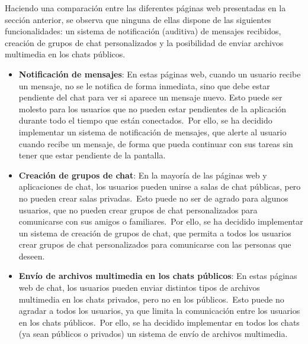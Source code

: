 
Haciendo una comparación entre las diferentes páginas web presentadas en la sección anterior, se
observa que ninguna de ellas dispone de las siguientes funcionalidades: un sistema de notificación (auditiva)
de mensajes recibidos, creación de grupos de chat personalizados y la posibilidad de enviar archivos
multimedia en los chats públicos.

\begin{itemize}
	\item \textbf{Notificación de mensajes}: En estas páginas web, cuando un usuario recibe un mensaje, no se le
	notifica de forma inmediata, sino que debe estar pendiente del chat para ver si aparece un mensaje nuevo.
	Esto puede ser molesto para los usuarios que no pueden estar pendientes de la aplicación durante todo el
	tiempo que están conectados.\ Por ello, se ha decidido implementar un sistema de notificación de mensajes,
	que alerte al usuario cuando recibe un mensaje, de forma que pueda continuar con sus tareas sin tener que
	estar pendiente de la pantalla.

	\item \textbf{Creación de grupos de chat}: En la mayoría de las páginas web y aplicaciones de chat, los usuarios
	pueden unirse a salas de chat públicas, pero no pueden crear salas privadas.\ Esto puede no ser de agrado
	para algunos usuarios, que no pueden crear grupos de chat personalizados para comunicarse con sus amigos o
	familiares.\ Por ello, se ha decidido implementar un sistema de creación de grupos de chat, que permita a
	todos los usuarios crear grupos de chat personalizados para comunicarse con las personas que deseen.

	\item \textbf{Envío de archivos multimedia en los chats públicos}: En estas páginas web
	de chat, los usuarios pueden enviar distintos tipos de archivos multimedia en los chats privados, pero no en
	los públicos.\ Esto puede no agradar a todos los usuarios, ya que limita la comunicación entre los usuarios en los
	chats públicos.\ Por ello, se ha decidido implementar en todos los chats (ya sean públicos o privados) un sistema
	de envío de archivos multimedia.
\end{itemize}
